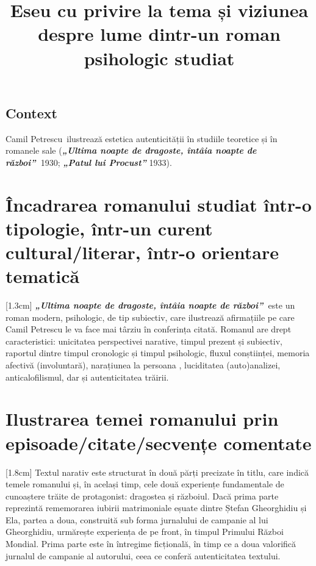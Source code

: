 \documentclass[
12pt,                        %
a4paper                      %
]{article}
\title{Eseu cu privire la tema și viziunea despre lume dintr-un roman psihologic studiat}
\date{}   %
\author{} %
\newcommand{\rom}[1]{\uppercase\expandafter{\romannumeral #1\relax}} %
\newcommand{\operatitle}{\textbf{\textit{„Ultima noapte de dragoste, întâia noapte de război”\ }}} %
\newcommand{\operaauthor}{Camil Petrescu\ } %
\begin{document}
\maketitle %



\subsection{Context}

\operaauthor ilustrează estetica autenticității în studiile teoretice și în romanele sale (\operatitle 1930; \textbf{\textit{„Patul lui Procust”}} 1933).

\section{Încadrarea romanului studiat într-o tipologie, într-un curent cultural/literar, într-o orientare tematică}

[1.3cm]
\operatitle este un roman modern, psihologic, de tip subiectiv, care ilustrează afirmațiile pe care Camil Petrescu le va face mai târziu în conferința citată. Romanul are drept caracteristici: unicitatea perspectivei narative, timpul prezent și subiectiv, raportul dintre timpul cronologic și timpul psihologic, fluxul conștiinței, memoria afectivă (involuntară), narațiunea la persoana \rom{1}, luciditatea (auto)analizei, anticalofilismul, dar și autenticitatea trăirii.

\section{Ilustrarea temei romanului prin episoade/citate/secvențe comentate}

[1.8cm]
Textul narativ este structurat în două părți precizate în titlu, care indică temele romanului și, în același timp, cele două experiențe fundamentale de cunoaștere trăite de protagonist: dragostea și războiul. Dacă prima parte reprezintă rememorarea iubirii matrimoniale eșuate dintre Ștefan Gheorghidiu și Ela, partea a doua, construită sub forma jurnalului de campanie al lui Gheorghidiu, urmărește experiența de pe front, în timpul Primului Război Mondial. Prima parte este în întregime ficțională, în timp ce a doua valorifică jurnalul de campanie al autorului, ceea ce conferă autenticitatea textului.
\end{document}
